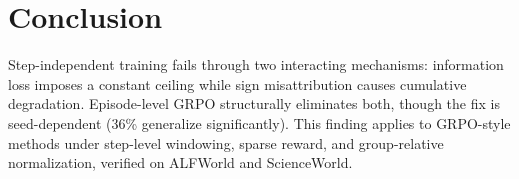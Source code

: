 \section{Conclusion}
\label{sec:conclusion}

Step-independent training fails through two interacting mechanisms: information loss imposes a constant ceiling while sign misattribution causes cumulative degradation. Episode-level GRPO structurally eliminates both, though the fix is seed-dependent (36\% generalize significantly). This finding applies to GRPO-style methods under step-level windowing, sparse reward, and group-relative normalization, verified on ALFWorld and ScienceWorld.
